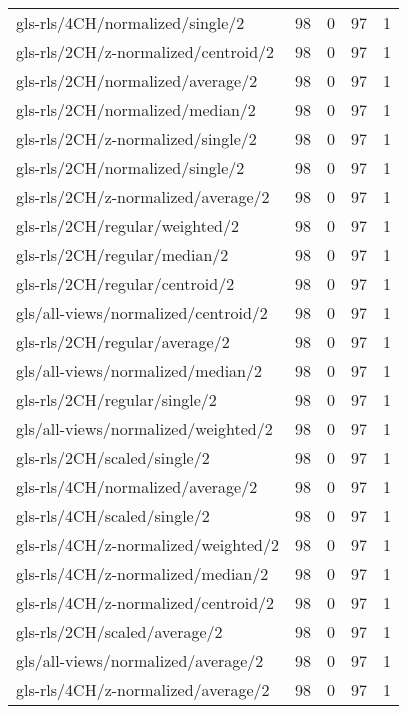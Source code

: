 \begin{longtable}{lrrrr}
    gls-rls/4CH/normalized/single/2           & 98 &  0 & 97 &  1 \\
    gls-rls/2CH/z-normalized/centroid/2       & 98 &  0 & 97 &  1 \\
    gls-rls/2CH/normalized/average/2          & 98 &  0 & 97 &  1 \\
    gls-rls/2CH/normalized/median/2           & 98 &  0 & 97 &  1 \\
    gls-rls/2CH/z-normalized/single/2         & 98 &  0 & 97 &  1 \\
    gls-rls/2CH/normalized/single/2           & 98 &  0 & 97 &  1 \\
    gls-rls/2CH/z-normalized/average/2        & 98 &  0 & 97 &  1 \\
    gls-rls/2CH/regular/weighted/2            & 98 &  0 & 97 &  1 \\
    gls-rls/2CH/regular/median/2              & 98 &  0 & 97 &  1 \\
    gls-rls/2CH/regular/centroid/2            & 98 &  0 & 97 &  1 \\
    gls/all-views/normalized/centroid/2       & 98 &  0 & 97 &  1 \\
    gls-rls/2CH/regular/average/2             & 98 &  0 & 97 &  1 \\
    gls/all-views/normalized/median/2         & 98 &  0 & 97 &  1 \\
    gls-rls/2CH/regular/single/2              & 98 &  0 & 97 &  1 \\
    gls/all-views/normalized/weighted/2       & 98 &  0 & 97 &  1 \\
    gls-rls/2CH/scaled/single/2               & 98 &  0 & 97 &  1 \\
    gls-rls/4CH/normalized/average/2          & 98 &  0 & 97 &  1 \\
    gls-rls/4CH/scaled/single/2               & 98 &  0 & 97 &  1 \\
    gls-rls/4CH/z-normalized/weighted/2       & 98 &  0 & 97 &  1 \\
    gls-rls/4CH/z-normalized/median/2         & 98 &  0 & 97 &  1 \\
    gls-rls/4CH/z-normalized/centroid/2       & 98 &  0 & 97 &  1 \\
    gls-rls/2CH/scaled/average/2              & 98 &  0 & 97 &  1 \\
    gls/all-views/normalized/average/2        & 98 &  0 & 97 &  1 \\
    gls-rls/4CH/z-normalized/average/2        & 98 &  0 & 97 &  1 \\

\end{longtable}
